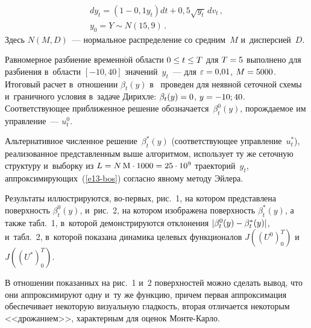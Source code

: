 \begin{multicols}{2}
\noindent
     \begin{multline}
     dy_t=\left( 1-0{,}1y_t\right) dt+0{,}5\sqrt{y_t}\,dv_t\,,\\ 
     y_0=Y\sim N(15{,}9)\,.
     \label{e13-bos}
     \end{multline}
Здесь $N(M,D)$~--- нормальное распределение со средним~$M$ 
и~дисперсией~$D$.
     
     Равномерное разбиение временн$\acute{\mbox{о}}$й области $0\hm\leq t\hm\leq T$ для 
$T\hm=5$ выполнено для разбиения в~об\-ласти $[-10, 40]$ значений~$y_t$~--- 
для $\varepsilon\hm=0{,}01$, $M\hm=5000$. Итоговый расчет в~отношении 
$\beta_t(y)$ в~\cite{2-bos} проведен для неявной сеточной схемы 
и~граничного условия в~задаче Дирихле: $\beta_t(y)\hm=0$, $y\hm=-10;40$. 
Соответствующее приближенное решение обозначается~$\beta_t^0(y)$, 
порождаемое им управление~--- $u_t^0$.
     
     Альтернативное численное решение~$\beta_t^*(y)$ (соответствующее 
управление~$u_t^*$), реализованное представленным выше алгоритмом, 
использует ту же сеточную структуру и~выборку из $L\hm= 
N \,\mathrm{M}\cdot 1000\hm= 25\cdot 10^9$ траекторий~$y_t$, 
аппроксимирующих~(\ref{e13-bos}) согласно явному методу Эйлера.
     
     Результаты иллюстрируются, во-пер\-вых, рис.~1, на котором 
представлена поверхность $\beta_t^0(y)$, и~рис.~2, на котором изображена 
поверхность $\beta_t^*(y)$, а также табл.~1, в~которой демонстрируются 
отклонения $\vert \beta_t^0(y)\hm- \beta_t^*(y)\vert$, и~табл.~2, в~которой 
показана динамика целевых функционалов $J((U^0)_0^T)$ и~$J((U^*)_0^T)$. 

     
     В отношении показанных на рис.~1 и~2 поверхностей можно сделать 
вывод, что они аппроксимируют одну и~ту же функцию, причем первая 
аппроксимация обеспечивает некоторую визуальную гладкость, вторая 
отличается некоторым <<дрожанием>>, характерным для оценок  
Мон\-те-Карло.
     
\begin{table*}\small %
\begin{center}
\vspace*{2ex}


\end{center}
\end{table*}
\end{multicols}
